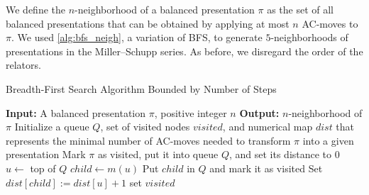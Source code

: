 We define the $n$-neighborhood of a balanced presentation $\pi$ as the set of all balanced presentations that can be obtained by applying at most $n$ AC-moves to $\pi$.
We used \autoref{alg:bfs_neigh}, a variation of BFS, to generate $5$-neighborhoods of presentations in the Miller--Schupp series. 
As before, we disregard the order of the relators.

\begin{algorithm}
	\caption{Breadth-First Search Algorithm Bounded by Number of Steps}\label{alg:bfs_neigh}
	\begin{algorithmic}[1]
		\State \textbf{Input:} A balanced presentation $\pi$, positive integer $n$
		\State \textbf{Output:} $n$-neighborhood of $\pi$
		\State Initialize a queue $Q$, set of visited nodes $visited$, and numerical map $dist$ that represents the minimal number of AC-moves needed to transform $\pi$ into a given presentation
		\State Mark $\pi$ as visited, put it into queue $Q$, and set its distance to $0$
		\State $u \gets $ top of $Q$ 
		\State $child \gets m(u)$
		\State Put $child$ in $Q$ and mark it as visited
		\State Set $dist[child] := dist[u] + 1$
		\EndIf
		\EndFor
		\EndWhile
		\Return set $visited$
	\end{algorithmic}
\end{algorithm}